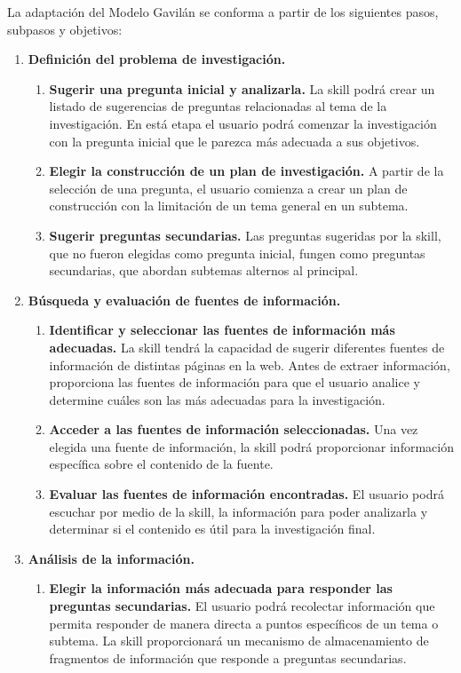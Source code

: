La adaptación del Modelo Gavilán se conforma a partir de los siguientes pasos, subpasos y objetivos:

\begin{enumerate}
  \item \textbf{Definición del problema de investigación.}
  \begin{enumerate}[1.]
    \item \textbf{Sugerir una pregunta inicial y analizarla.} La skill podrá crear un listado de sugerencias de preguntas relacionadas al tema de la investigación. En está etapa el usuario podrá comenzar la investigación con la pregunta inicial que le parezca más adecuada a sus objetivos.
    \item \textbf{Elegir la construcción de un plan de investigación.} A partir de la selección de una pregunta, el usuario comienza a crear un plan de construcción con la limitación de un tema general en un subtema.
    \item \textbf{Sugerir preguntas secundarias.} Las preguntas sugeridas por la skill, que no fueron elegidas como pregunta inicial, fungen como preguntas secundarias, que abordan subtemas alternos al principal.
  \end{enumerate}
  \item \textbf{Búsqueda y evaluación de fuentes de información.}
  \begin{enumerate}[1.]
    \item \textbf{Identificar y seleccionar las fuentes de información más adecuadas.} La skill tendrá la capacidad de sugerir diferentes fuentes de información de distintas páginas en la web. Antes de extraer información, proporciona las fuentes de información para que el usuario analice y determine cuáles son las más adecuadas para la investigación.
    \item \textbf{Acceder a las fuentes de información seleccionadas.} Una vez elegida una fuente de información, la skill podrá proporcionar información específica sobre el contenido de la fuente.
    \item \textbf{Evaluar las fuentes de información encontradas.} El usuario podrá escuchar por medio de la skill, la información para poder analizarla y determinar si el contenido es útil para la investigación final.
  \end{enumerate}
  \item \textbf{Análisis de la información.}
  \begin{enumerate}[1.]
    \item \textbf{Elegir la información más adecuada para responder las preguntas secundarias.} El usuario podrá recolectar información que permita responder de manera directa a puntos específicos de un tema o subtema. La skill proporcionará un mecanismo de almacenamiento de fragmentos de información que responde a preguntas secundarias.

\end{enumerate}
\end{enumerate}
